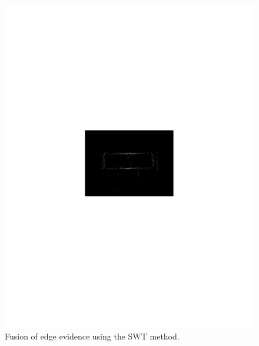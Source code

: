 \documentclass[conference]{IEEEtran}
\begin{document}
{{{{\begin{figure}[hbt]
	\includegraphics[scale=0.5]{flevoland_fusao_swt_crop.pdf}
	\caption{Fusion of edge evidence using the SWT method.}
\label{fig_06}
\end{figure}
\begin{figure}[hbt]

\end{figure}}}}}
\end{document}
